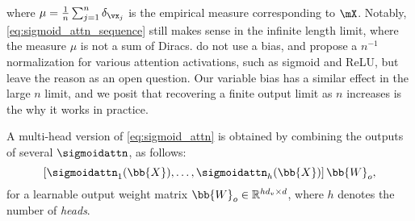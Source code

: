 where 
$\mu = \frac1n\sum_{j=1}^n\delta_{\vx_j}$ is the empirical measure corresponding to $\mX$.
Notably, \cref{eq:sigmoid_attn_sequence} still makes sense in the infinite length limit, where the measure $\mu$ is not a sum of Diracs. \citet{wortsman2023replacing} do not use a bias, and propose a $n^{-1}$ normalization for various attention activations, such as sigmoid and ReLU, but leave the reason as an open question.
Our variable bias has a similar effect in the large $n$ limit, and we posit that recovering a finite output limit as $n$ increases is the why it works in practice.

A multi-head version of \cref{eq:sigmoid_attn} is obtained by combining the outputs of several $\sigmoidattn$, as follows:
\begin{equation}
    \left[\sigmoidattn_1(\bb{X}),\dots,\sigmoidattn_h(\bb{X})\right]\bb{W}_o,
\end{equation}
for a learnable output weight matrix $\bb{W}_o\in\mathbb{R}^{hd_v\times d}$, where $h$ denotes the number of \emph{heads}.



